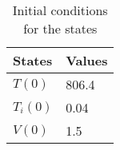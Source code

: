 \begin{table}
	\centering
	\begin{tabular}{ll}
		\toprule
			\textbf{States} & \textbf{Values}
            \\
        \midrule
            $T(0)$ & 806.4
            \\
        	$T_{i}(0)$ & 0.04
			\\
            $V(0)$ & 1.5
            \\
		\bottomrule
    \end{tabular}
	\caption{Initial conditions for the states}
\end{table}